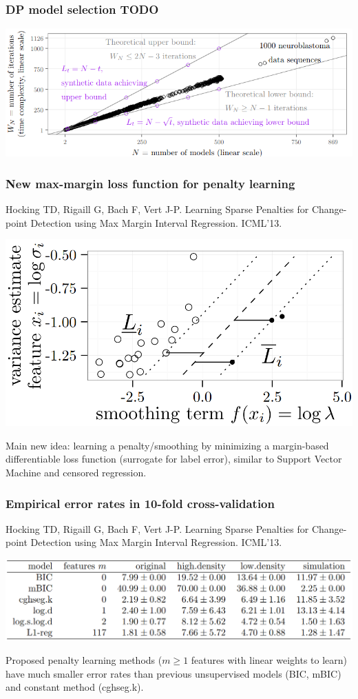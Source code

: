 \documentclass[t]{beamer}
\begin{document}
\begin{frame}
  \frametitle{DP model selection TODO}
  \includegraphics[width=\textwidth]{figure-dp-model-selection-iterations}
\end{frame}

\begin{frame}
  \frametitle{New max-margin loss function for penalty learning}
  {\scriptsize Hocking TD, Rigaill G, Bach F, Vert J-P. Learning Sparse Penalties
  for Change-point Detection using Max Margin Interval
  Regression. ICML'13.}

  \includegraphics[width=\textwidth]{figure-ICML13-margin}

  Main new idea: learning a penalty/smoothing by minimizing a
  margin-based differentiable loss function (surrogate for label
  error), similar to Support Vector Machine and censored regression.
\end{frame}

\begin{frame}
  \frametitle{Empirical error rates in 10-fold cross-validation}
  {\scriptsize Hocking TD, Rigaill G, Bach F, Vert J-P. Learning Sparse Penalties
  for Change-point Detection using Max Margin Interval
  Regression. ICML'13.}

  \includegraphics[width=\textwidth]{table-ICML13-error-rates}

  Proposed penalty learning methods ($m\geq 1$ features with linear
  weights to learn) have much smaller error rates than previous
  unsupervised models (BIC, mBIC) and constant method (cghseg.k).
\end{frame}
\end{document}

